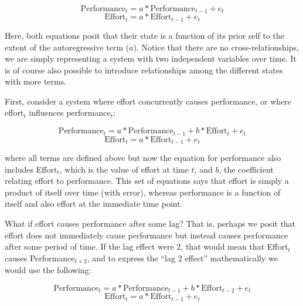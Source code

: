 \documentclass[english,,man]{apa6}
\theoremstyle{definition}
\theoremstyle{definition}
\theoremstyle{definition}
\theoremstyle{remark}
\begin{document}
\begin{equation}
\label{sysy}
\textrm{Performance}_{t} = a * \textrm{Performance}_{t - 1} + e_{t}
\end{equation} \begin{equation}
\label{sysx}
\textrm{Effort}_{t} = a * \textrm{Effort}_{t - 1} + e_{t}
\end{equation}

\noindent Here, both equations posit that their state is a function of
its prior self to the extent of the autoregressive term (\(a\)). Notice
that there are no cross-relationships, we are simply representing a
system with two independent variables over time. It is of course also
possible to introduce relationships among the different states with more
terms.

First, consider a system where effort concurrently causes performance,
or where effort\(_t\) influences performance\(_t\):

\begin{equation}
\label{sysy2}
\textrm{Performance}_{t} = a * \textrm{Performance}_{t - 1} + b * \textrm{Effort}_{t} + e_{t}
\end{equation} \begin{equation}
\label{sysx2}
\textrm{Effort}_{t} = a * \textrm{Effort}_{t - 1} + e_{t}
\end{equation}

\noindent where all terms are defined above but now the equation for
performance also includes Effort\(_t\), which is the value of effort at
time \(t\), and \(b\), the coefficient relating effort to performance.
This set of equations says that effort is simply a product of itself
over time (with error), whereas performance is a function of itself and
also effort at the immediate time point.

What if effort causes performance after some lag? That is, perhaps we
posit that effort does not immediately cause performance but instead
causes performance after some period of time. If the lag effect were 2,
that would mean that Effort\(_t\) causes Performance\(_{t+2}\), and to
express the \enquote{lag 2 effect} mathematically we would use the
following:

\begin{equation}
\label{sysy3}
\textrm{Performance}_{t} = a * \textrm{Performance}_{t - 1} + b * \textrm{Effort}_{t - 2} + e_{t}
\end{equation} \begin{equation}
\label{sysx3}
\textrm{Effort}_{t} = a * \textrm{Effort}_{t - 1} + e_{t}
\end{equation}
\end{document}
